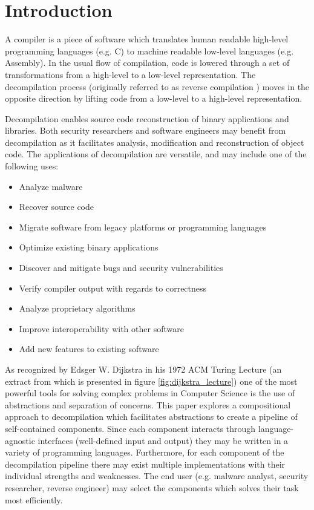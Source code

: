 
\section{Introduction}
\label{sec:introduction}

A compiler is a piece of software which translates human readable high-level programming languages (e.g. C) to machine readable low-level languages (e.g. Assembly). In the usual flow of compilation, code is lowered through a set of transformations from a high-level to a low-level representation. The decompilation process (originally referred to as reverse compilation \cite{reverse_comp}) moves in the opposite direction by lifting code from a low-level to a high-level representation.

Decompilation enables source code reconstruction of binary applications and libraries. Both security researchers and software engineers may benefit from decompilation as it facilitates analysis, modification and reconstruction of object code. The applications of decompilation are versatile, and may include one of the following uses:

\begin{itemize}
	\item Analyze malware
	\item Recover source code
	\item Migrate software from legacy platforms or programming languages
	\item Optimize existing binary applications
	\item Discover and mitigate bugs and security vulnerabilities
	\item Verify compiler output with regards to correctness
	\item Analyze proprietary algorithms
	\item Improve interoperability with other software
	\item Add new features to existing software
\end{itemize}

As recognized by Edsger W. Dijkstra in his 1972 ACM Turing Lecture (an extract from which is presented in figure \ref{fig:dijkstra_lecture}) one of the most powerful tools for solving complex problems in Computer Science is the use of abstractions and separation of concerns. This paper explores a compositional approach to decompilation which facilitates abstractions to create a pipeline of self-contained components. Since each component interacts through language-agnostic interfaces (well-defined input and output) they may be written in a variety of programming languages. Furthermore, for each component of the decompilation pipeline there may exist multiple implementations with their individual strengths and weaknesses. The end user (e.g. malware analyst, security researcher, reverse engineer) may select the components which solves their task most efficiently.

